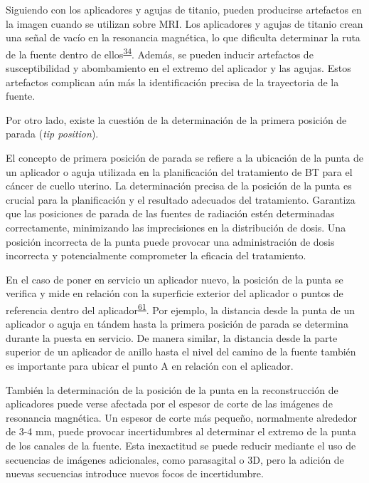 \documentclass[
  a4paper,
]{scrreprt}
\begin{document}
Siguiendo con los aplicadores y agujas de titanio, pueden producirse
artefactos en la imagen cuando se utilizan sobre MRI. Los aplicadores y
agujas de titanio crean una señal de vacío en la resonancia magnética,
lo que dificulta determinar la ruta de la fuente dentro de
ellos\textsuperscript{\protect\hyperlink{ref-richart2018}{34}}. Además,
se pueden inducir artefactos de susceptibilidad y abombamiento en el
extremo del aplicador y las agujas. Estos artefactos complican aún más
la identificación precisa de la trayectoria de la fuente.

Por otro lado, existe la cuestión de la determinación de la primera
posición de parada (\emph{tip position}).

El concepto de primera posición de parada se refiere a la ubicación de
la punta de un aplicador o aguja utilizada en la planificación del
tratamiento de BT para el cáncer de cuello uterino. La determinación
precisa de la posición de la punta es crucial para la planificación y el
resultado adecuados del tratamiento. Garantiza que las posiciones de
parada de las fuentes de radiación estén determinadas correctamente,
minimizando las imprecisiones en la distribución de dosis. Una posición
incorrecta de la punta puede provocar una administración de dosis
incorrecta y potencialmente comprometer la eficacia del tratamiento.

En el caso de poner en servicio un aplicador nuevo, la posición de la
punta se verifica y mide en relación con la superficie exterior del
aplicador o puntos de referencia dentro del
aplicador\textsuperscript{\protect\hyperlink{ref-hellebust2010}{61}}.
Por ejemplo, la distancia desde la punta de un aplicador o aguja en
tándem hasta la primera posición de parada se determina durante la
puesta en servicio. De manera similar, la distancia desde la parte
superior de un aplicador de anillo hasta el nivel del camino de la
fuente también es importante para ubicar el punto A en relación con el
aplicador.

También la determinación de la posición de la punta en la reconstrucción
de aplicadores puede verse afectada por el espesor de corte de las
imágenes de resonancia magnética. Un espesor de corte más pequeño,
normalmente alrededor de 3-4 mm, puede provocar incertidumbres al
determinar el extremo de la punta de los canales de la fuente. Esta
inexactitud se puede reducir mediante el uso de secuencias de imágenes
adicionales, como parasagital o 3D, pero la adición de nuevas secuencias
introduce nuevos focos de incertidumbre.
\end{document}
